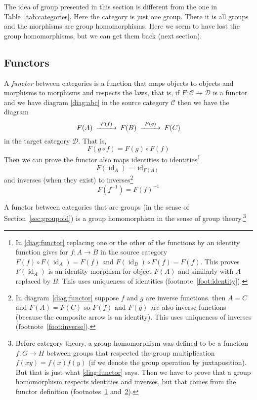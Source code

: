\documentclass[11pt]{article}
\DeclareMathOperator{\idfun}{id}
\begin{document}
The idea of group presented in this section is different from the one
in Table~\ref{tab:categories}.  Here the category is just one group.
There it is all groups and the morphisms are group homomorphisms.
Here we seem to have lost the group homomorphisms, but we can get them
back (next section).

\subsection{Functors}

A \emph{functor} between categories is a function that maps
objects to objects and morphisms to morphisms and respects the laws,
that is, if $F : \mathcal{C} \to \mathcal{D}$ is a functor
and we have diagram \eqref{diag:abc}
in the source category $\mathcal{C}$ then we have the diagram
\begin{equation}
\label{diag:functor}
\begin{CD}
   F(A) @>{F(f)}>> F(B) @>{F(g)}>> F(C)
\end{CD}
\end{equation}
in the target category $\mathcal{D}$. That is,
$$
   F(g \circ f) = F(g) \circ F(f)
$$
Then we can prove the functor also maps
identities to identities\footnote{In \eqref{diag:functor} replacing
one or the other of the functions by an identity function gives
for $f : A \to B$ in the source category
$F(f) \circ F(\idfun_A) = F(f)$ and
$F(\idfun_B) \circ F(f) = F(f)$.  This proves $F(\idfun_A)$ is an
identity morphism for object $F(A)$ and similarly with $A$ replaced by $B$.
This uses uniqueness of identities
(footnote~\ref{foot:identity}).\label{foot:functor-identity}}
$$
   F(\idfun_A) = \idfun_{F(A)}
$$
and inverses (when they exist) to inverses\footnote{In
diagram~\eqref{diag:functor} suppose $f$ and $g$ are inverse functions.
then $A = C$ and $F(A) = F(C)$ so $F(f)$ and $F(g)$ are also inverse functions
(because the composite arrow is an identity).
This uses uniqueness of inverses
(footnote~\ref{foot:inverse}).\label{foot:functor-inverse}}
$$
   F(f^{-1}) = F(f)^{-1}
$$

A functor between categories that are groups
(in the sense of Section~\ref{sec:groupoid})
is a group homomorphism in the sense of group theory.\footnote{Before
category theory, a group homomorphism was defined to be
a function $f : G \to H$ between groups that respected the group
multiplication $f(x y) = f(x) f(y)$ (if we denote the group operation by
juxtaposition).  But that is just what \eqref{diag:functor} says.
Then we have to prove that a group homomorphism respects identities
and inverses, but that comes from the functor definition
(footnotes~\ref{foot:functor-identity} and~\ref{foot:functor-inverse}).}
\end{document}
